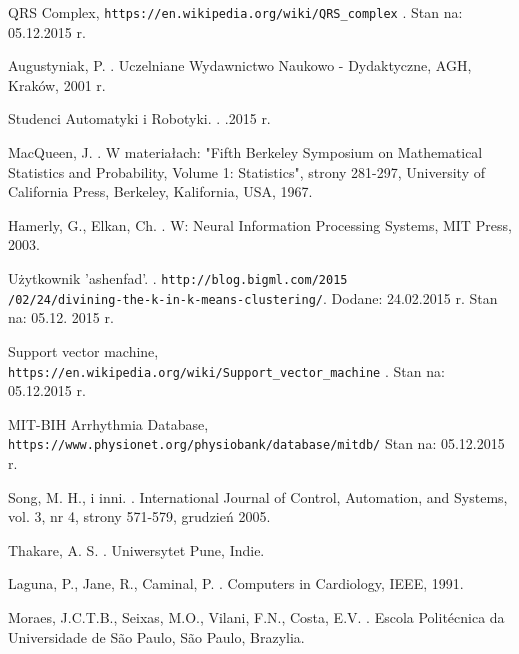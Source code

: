 
\begin{thebibliography}{99} %

QRS Complex,
\newblock \texttt{https://en.wikipedia.org/wiki/QRS\_complex} .
\newblock Stan na: 05.12.2015 r.

Augustyniak, P.
.
\newblock Uczelniane Wydawnictwo Naukowo - Dydaktyczne, AGH, Kraków, 2001 r.


Studenci Automatyki i Robotyki.
.
.2015 r.

MacQueen, J.
.
\newblock W materiałach: "Fifth Berkeley Symposium on Mathematical Statistics and Probability, Volume 1: Statistics", strony 281-297,
\newblock University of California Press, Berkeley, Kalifornia, USA, 1967. 

Hamerly, G., Elkan, Ch.
.
\newblock W: Neural Information Processing Systems,
\newblock MIT Press, 2003.

Użytkownik 'ashenfad'.
.
\newblock \texttt{http://blog.bigml.com/2015\\/02/24/divining-the-k-in-k-means-clustering/}. 
\newblock Dodane: 24.02.2015 r.
\newblock Stan na: 05.12. 2015 r.

Support vector machine,
\newblock \texttt{https://en.wikipedia.org/wiki/Support\_vector\_machine} .
\newblock Stan na: 05.12.2015 r.

MIT-BIH Arrhythmia Database,
\newblock \texttt{https://www.physionet.org/physiobank/database/mitdb/}
\newblock Stan na: 05.12.2015 r.

Song, M. H., i inni.
.
\newblock International Journal of Control, Automation, and Systems, vol. 3, nr 4, strony 571-579, grudzień 2005.

Thakare, A. S.
.
\newblock Uniwersytet Pune, Indie.

Laguna, P., Jane, R., Caminal, P.
.
\newblock Computers in Cardiology, IEEE, 1991.

Moraes, J.C.T.B., Seixas, M.O., Vilani, F.N., Costa, E.V.
.
\newblock Escola Politécnica da Universidade de São Paulo, São Paulo, Brazylia.

\end{thebibliography}